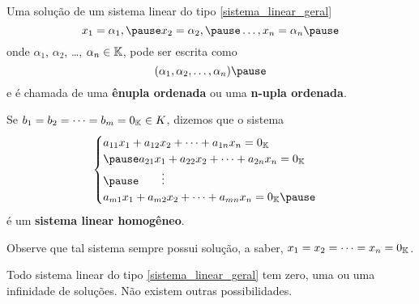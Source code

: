 \documentclass{beamer}
\begin{document}
    \begin{frame}
        \vspace{.3cm}

        Uma solução de um sistema linear do tipo \eqref{sistema_linear_geral}\pause
        \[
            x_1 = \alpha_1, \pause x_2 = \alpha_2, \pause \dots, x_n = \alpha_n\pause
        \]
        onde $\alpha_1$, $\alpha_2$, \dots, $\alpha_n \in \mathbb{K}$, \pause pode ser escrita como\pause
        \[
            (\alpha_1, \alpha_2, \dots, \alpha_n)\pause
        \]
        e é chamada de uma \textbf{ênupla ordenada} ou uma \textbf{n-upla ordenada}.
    \end{frame}

    \begin{frame}
        Se $b_1 = b_2 = \cdots = b_m = 0_{\mathbb{K}} \in K$, \pause dizemos que o sistema\pause
        \begin{equation}\label{sistemalinearhomogeneo}\index{Sistema Linear}
            \begin{cases}
                a_{11}x_1 + a_{12}x_2 + \cdots + a_{1n}x_n = 0_\cp{K}\\\pause
                a_{21}x_1 + a_{22}x_2 + \cdots + a_{2n}x_n = 0_\cp{K}\\\pause
                \qquad \vdots\\
                a_{m1}x_1 + a_{m2}x_2 + \cdots + a_{mn}x_n = 0_\cp{K}\pause
            \end{cases}
        \end{equation}
        \'e um \textbf{sistema linear homog\^eneo}. \pause

        \vspace{.3cm}

        Observe que tal sistema sempre possui solu\c{c}\~ao, \pause a saber, $x_1 = x_2 = \cdots = x_n = 0_{\mathbb{K}}$.
    \end{frame}

    \begin{frame}
        \begin{teorema}
            Todo sistema linear do tipo \eqref{sistema_linear_geral} tem zero, \pause uma \pause ou uma infinidade de soluções. \pause Não existem outras possibilidades.
        \end{teorema}
    \end{frame}
\end{document}
